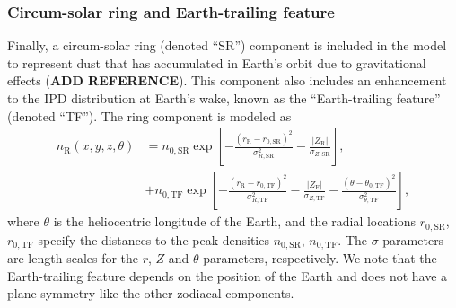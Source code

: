 \documentclass[twocolumn]{aa}
\begin{document}
\subsubsection{Circum-solar ring and Earth-trailing feature}
\label{sec:ring}
Finally, a circum-solar ring (denoted ``SR'') component is included in the
model to represent dust that has accumulated in Earth's orbit due to
gravitational effects ({\bf ADD REFERENCE}). This component also
includes an enhancement to the IPD distribution at Earth's wake, known
as the ``Earth-trailing feature'' (denoted ``TF''). The ring component is modeled as
\begin{align}
    n_\mathrm{R}(x, y, z, \theta)&=n_{0, \mathrm{SR}} \exp \left[-\frac{\left(r_\mathrm{R}-r_{0, \mathrm{SR}}\right)^2}{\sigma_{R,\mathrm{SR}} ^2}-\frac{\left| Z_\mathrm{R} \right|}{\sigma_{Z, \mathrm{SR}}}\right],\\
   &+ n_{0, \mathrm{TF}} \exp \left[-\frac{\left(r_\mathrm{R}-r_{0,
          \mathrm{TF}}\right)^{2}}{\sigma_{R,
          \mathrm{TF}}^{2}}-\frac{\left|Z_\mathrm{F}\right|}{\sigma_{Z,
          \mathrm{TF}}}-\frac{\left(\theta-\theta_{0,
          \mathrm{TF}}\right)^{2}}{\sigma_{\theta,\mathrm{TF}}^{2}}\right],
    \label{eq:ring}
\end{align}
where $\theta$ is the heliocentric longitude of the Earth, and the 
radial locations $r_{0, \mathrm{SR}}$, $r_{0, \mathrm{TF}}$ specify
the distances to the peak densities $n_{0, \mathrm{SR}}$, 
$n_{0, \mathrm{TF}}$. The $\sigma$ parameters are length scales for the 
$r$, $Z$ and $\theta$ parameters, respectively. We note that the 
Earth-trailing feature depends on the position of the Earth and does not 
have a plane symmetry like the other zodiacal components. 
\end{document}
